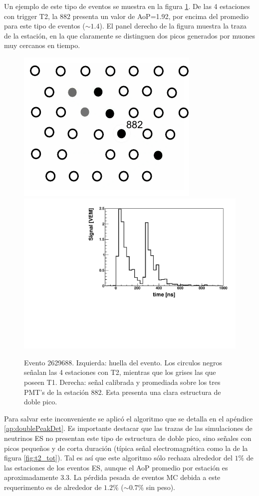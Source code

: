 	Un ejemplo de este tipo de eventos se muestra en la figura \ref{fig:doublePeakEvent}.
	De las 4 estaciones con trigger T2, la 882 presenta un valor de AoP=1.92, por encima del promedio para este tipo de eventos ($\sim1.4$). 
	El panel derecho de la figura muestra la traza de la estación, en la que claramente se distinguen dos picos generados por muones muy cercanos en tiempo.
	\begin{figure}[ht]
	\begin{center}
	\includegraphics[height=0.35\textwidth]{fig/seleccionAuger/2629688_nice}
	\hfill
	\includegraphics[height=0.35\textwidth]{fig/seleccionAuger/ev2629688_pmtAvg_anode}
	\caption{Evento 2629688. Izquierda: huella del evento. Los circulos negros señalan las 4 estaciones con T2, mientras que los grises las que poseen T1. Derecha: señal calibrada y promediada sobre los tres PMT's de la estación 882. Esta presenta una clara estructura de doble pico. }
	\label{fig:doublePeakEvent}
	\end{center}
	\end{figure}
	
	Para salvar este inconveniente se aplicó el algoritmo que se detalla en el ap\'endice \ref{ap:doublePeakDet}.
	Es importante destacar que las trazas de las simulaciones de neutrinos ES no presentan este tipo de estructura de doble pico, sino señales con picos pequeños y de corta duración (típica señal electromagnética como la de la figura \ref{fig:t2_tot}).
	Tal es así que este algoritmo sólo rechaza alrededor del $1\%$ de las estaciones de los eventos ES, aunque el AoP promedio por estación es aproximadamente 3.3.
	La pérdida pesada de eventos MC debida a este requerimento es de alrededor de $1.2\%$ ($\sim 0.7\%$ sin peso).
	
